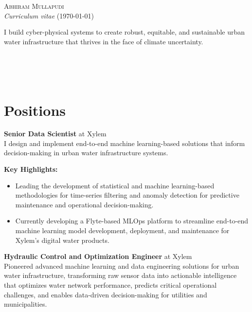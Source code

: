 \documentclass[a4paper,11pt]{article}
\newcommand{\years}[1]{%
  {\reversemarginpar\strut\marginnote{{\small#1}}}%
}
\begin{document}
{\huge \textsc{Abhiram Mullapudi}}\\
{\small \textit{Curriculum vitae} (\today)}\\

\begin{vwcol}[widths={0.78,0.22}]
{\footnotesize I build cyber-physical systems to create robust, equitable, and sustainable urban water infrastructure that thrives in the face of climate uncertainty.}

\vfill\eject

{\scriptsize {\\
{\faHome{}}\\
{\faGithub{}}\\}}
\end{vwcol}

\section*{Positions}

\years{2023--}
\textbf{Senior Data Scientist} at Xylem\\[0.1cm]
I design and implement end-to-end machine learning-based solutions that inform decision-making in urban water infrastructure systems.

\vspace{2mm}
{\small \textbf{Key Highlights:}}
\vspace{-2mm}
\begin{itemize}
	\setlength\itemsep{1mm}
	\item  Leading the development of statistical and machine learning-based methodologies for time-series filtering and anomaly detection for predictive maintenance and operational decision-making.
	\item  Currently developing a Flyte-based MLOps platform to streamline end-to-end machine learning model development, deployment, and maintenance for Xylem's digital water products.
\end{itemize}

\years{2020--2023}
\textbf{Hydraulic Control and Optimization Engineer} at Xylem\\[0.1cm]
Pioneered advanced machine learning and data engineering solutions for urban water infrastructure, transforming raw sensor data into actionable intelligence that optimizes water network performance, predicts critical operational challenges, and enables data-driven decision-making for utilities and municipalities.
\end{document}
